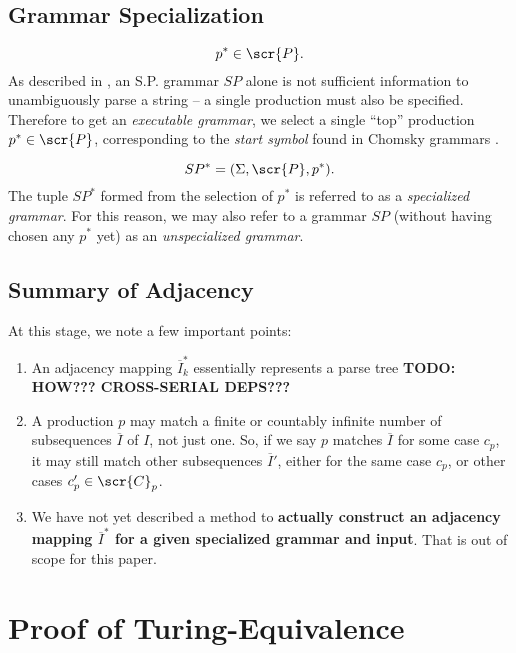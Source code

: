 \documentclass[10pt]{article}
\newcommand{\generalsubseq}{\overbar{I}}
\begin{document}
\subsection{Grammar Specialization}
\label{sec:grammar-specialization}
\begin{equation}
  \label{eq:p-top}
  p^* \in \scr{P}.
\end{equation}
As described in , an S.P. grammar $SP$ alone is not sufficient information to unambiguously parse a string -- a single production must also be specified. Therefore to get an \textit{executable grammar}, we select a single ``top'' production $p^* \in \scr{P}$, corresponding to the \textit{start symbol} found in Chomsky grammars .

\begin{equation}
  \label{eq:specialized}
  SP^* = (\Sigma, \scr{P}, p^*).
\end{equation}
The tuple $SP^*$ formed from the selection of $p^*$ is referred to as a \textit{specialized grammar}. For this reason, we may also refer to a grammar $SP$ (without having chosen any $p^*$ yet) as an \textit{unspecialized grammar}.

\subsection{Summary of Adjacency}
\label{sec:summary-of-adjacency}
At this stage, we note a few important points:
\begin{enumerate}
  \item An adjacency mapping $\generalsubseq^*_k$ essentially represents a parse tree \textbf{TODO: HOW??? CROSS-SERIAL DEPS???}
  \item A production $p$ may match a finite or countably infinite number of subsequences $\generalsubseq$ of $I$, not just one. So, if we say $p$ matches $\generalsubseq$ for some case $c_p$, it may still match other subsequences $\generalsubseq'$, either for the same case $c_p$, or other cases $c'_p \in \scr{C}_p$.
  \item We have not yet described a method to \textbf{actually construct an adjacency mapping $\generalsubseq^*$ for a given specialized grammar and input}. That is out of scope for this paper.
\end{enumerate}

\section{Proof of Turing-Equivalence}
\label{sec:proof-of-turing-equivalence}
\end{document}
